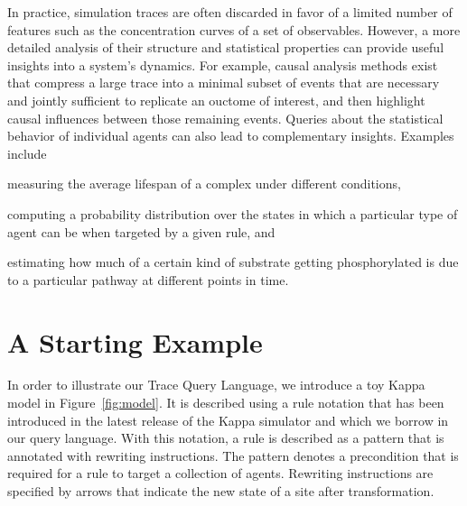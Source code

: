 \documentclass[runningheads]{llncs}
\begin{document}
In practice, simulation traces are often discarded in favor of a
limited number of features such as the concentration curves of a set
of observables. However, a more detailed analysis of their structure
and statistical properties can provide useful insights into a system's
dynamics. For example, causal analysis methods exist
\cite{DanosEtAl-CONCUR07,DBLP:conf/fsttcs/DanosFFHH12} that compress a
large trace into a minimal subset of events that are necessary and
jointly sufficient to replicate an ouctome of interest, and then
highlight causal influences between those remaining events.
Queries about the statistical behavior of individual agents can also
lead to complementary insights. Examples include
\begin{inparaenum}[(i)]
\item measuring the average lifespan of a complex under different
  conditions,
\item computing a probability distribution over the states in which a
  particular type of agent can be when targeted by a given rule, and
\item estimating how much of a certain kind of substrate getting
  phosphorylated is due to a particular pathway at different points in
  time.
\end{inparaenum}



\section{A Starting Example}\label{sec:starting-example}

In order to illustrate our Trace Query Language, we introduce a toy
Kappa model in Figure~\ref{fig:model}. It is described using a rule
notation that has been introduced in the latest release of the Kappa
simulator and which we borrow in our query language. With this
notation, a rule is described as a pattern that is annotated with
rewriting instructions. The pattern denotes a precondition that is
required for a rule to target a collection of agents. Rewriting
instructions are specified by arrows that indicate the new state of a
site after transformation.
\end{document}
